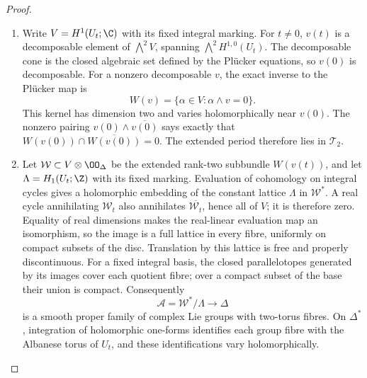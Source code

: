 \begin{proof}
\begin{enumerate}[leftmargin=*]
\item Write $V=H^1(U_t;\C)$ with its fixed integral marking.
For $t\ne0$, $v(t)$ is a decomposable element of
$\bigwedge^2V$, spanning $\bigwedge^2H^{1,0}(U_t)$.
The decomposable cone is the closed algebraic set defined by
the Pl\"ucker equations, so $v(0)$ is decomposable. For a
nonzero decomposable $v$, the exact inverse to the Pl\"ucker
map is
\[
 W(v)=\{\alpha\in V:\alpha\wedge v=0\}.
\]
This kernel has dimension two and varies holomorphically near
$v(0)$. The nonzero pairing
$v(0)\wedge\overline{v(0)}$ says exactly that
$W(v(0))\cap\overline{W(v(0))}=0$. The extended period
therefore lies in $\mathcal T_2$.

\item Let $\mathcal W\subset V\otimes\OO_\Delta$ be the extended
rank-two subbundle $W(v(t))$, and let
$\Lambda=H_1(U_t;\Z)$ with its fixed marking. Evaluation of
cohomology on integral cycles gives a holomorphic embedding
of the constant lattice $\Lambda$ in $\mathcal W^*$.
A real cycle annihilating $\mathcal W_t$ also annihilates
$\overline{\mathcal W_t}$, hence all of $V$; it is therefore zero.
Equality of real dimensions makes the real-linear evaluation
map an isomorphism, so the image is a full lattice in every fibre,
uniformly on compact subsets of the disc. Translation by this
lattice is free and properly discontinuous. For a fixed integral
basis, the closed parallelotopes generated by its images cover
each quotient fibre; over a compact subset of the base their
union is compact. Consequently
\[
 \mathcal A=\mathcal W^*/\Lambda\longrightarrow\Delta
\]
is a smooth proper family of complex Lie groups with
two-torus fibres. On $\Delta^*$, integration of holomorphic
one-forms identifies each group fibre with the Albanese torus
of $U_t$, and these identifications vary holomorphically.


\end{enumerate}
\end{proof}